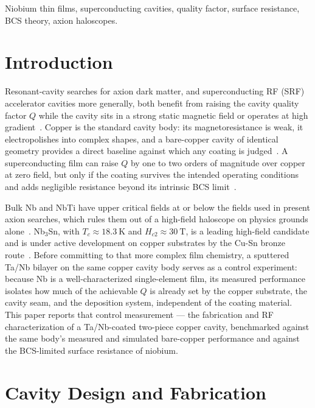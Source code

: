 \documentclass[10pt,journal]{IEEEtran}
\begin{document}
\begin{IEEEkeywords}
Niobium thin films, superconducting cavities, quality factor, surface resistance, BCS theory, axion haloscopes.
\end{IEEEkeywords}

\section{Introduction}

Resonant-cavity searches for axion dark matter, and superconducting RF (SRF) accelerator cavities more generally, both benefit from raising the cavity quality factor $Q$ while the cavity sits in a strong static magnetic field or operates at high gradient~\cite{ADMX:2009iij}. Copper is the standard cavity body: its magnetoresistance is weak, it electropolishes into complex shapes, and a bare-copper cavity of identical geometry provides a direct baseline against which any coating is judged~\cite{Braine:2024nzi}. A superconducting film can raise $Q$ by one to two orders of magnitude over copper at zero field, but only if the coating survives the intended operating conditions and adds negligible resistance beyond its intrinsic BCS limit~\cite{Ciovati:2014zti}.

Bulk Nb and NbTi have upper critical fields at or below the fields used in present axion searches, which rules them out of a high-field haloscope on physics grounds alone~\cite{gurevichUseNotUse2011}. Nb$_3$Sn, with $T_c \approx \SI{18.3}{\kelvin}$ and $H_{c2}\approx\SI{30}{\tesla}$, is a leading high-field candidate and is under active development on copper substrates by the Cu-Sn bronze route~\cite{withanageRapidNbSn2021, Posen:2018zjb}. Before committing to that more complex film chemistry, a sputtered Ta/Nb bilayer on the same copper cavity body serves as a control experiment: because Nb is a well-characterized single-element film, its measured performance isolates how much of the achievable $Q$ is already set by the copper substrate, the cavity seam, and the deposition system, independent of the coating material. This paper reports that control measurement --- the fabrication and RF characterization of a Ta/Nb-coated two-piece copper cavity, benchmarked against the same body's measured and simulated bare-copper performance and against the BCS-limited surface resistance of niobium.

\section{Cavity Design and Fabrication}
\end{document}
